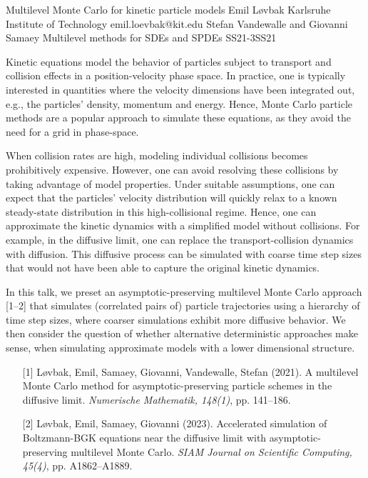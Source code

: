 \begin{talk}
  {Multilevel Monte Carlo for kinetic particle models}%
  {Emil Løvbak}%
  {Karlsruhe Institute of Technology}%
  {emil.loevbak@kit.edu}%
  {Stefan Vandewalle and Giovanni Samaey}%
{Multilevel methods for SDEs and SPDEs}
{}{SS21-3}{SS21}

			
Kinetic equations model the behavior of particles subject to transport and collision effects in a position-velocity phase space. In practice, one is typically interested in quantities where the velocity dimensions have been integrated out, e.g., the particles' density, momentum and energy. Hence, Monte Carlo particle methods are a popular approach to simulate these equations, as they avoid the need for a grid in phase-space.

When collision rates are high, modeling individual collisions becomes prohibitively expensive. However, one can avoid resolving these collisions by taking advantage of model properties. Under suitable assumptions, one can expect that the particles' velocity distribution will quickly relax to a known steady-state distribution in this high-collisional regime. Hence, one can approximate the kinetic dynamics with a simplified model without collisions. For example, in the diffusive limit, one can replace the transport-collision dynamics with diffusion. This diffusive process can be simulated with coarse time step sizes that would not have been able to capture the original kinetic dynamics.

In this talk, we preset an asymptotic-preserving multilevel Monte Carlo approach [1--2] that simulates (correlated pairs of) particle trajectories using a hierarchy of time step sizes, where coarser simulations exhibit more diffusive behavior. We then consider the question of whether alternative deterministic approaches make sense, when simulating approximate models with a lower dimensional structure.

\begin{enumerate}
	\item[{[1]}] Løvbak, Emil, Samaey, Giovanni, Vandewalle, Stefan (2021). A multilevel Monte Carlo method for asymptotic-preserving particle schemes in the diffusive limit. \textit{Numerische Mathematik, 148(1)}, pp. 141--186.
	\item[{[2]}] Løvbak, Emil, Samaey, Giovanni (2023). Accelerated simulation of Boltzmann-BGK equations near the diffusive limit with asymptotic-preserving multilevel Monte Carlo. \textit{SIAM Journal on Scientific Computing, 45(4)}, pp. A1862--A1889.
\end{enumerate}

\end{talk}

